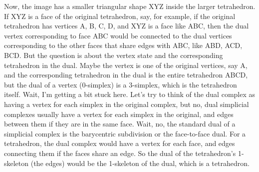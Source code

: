 Now, the image has a smaller triangular shape XYZ inside the larger tetrahedron. If XYZ is a face of the original tetrahedron, say, for example, if the original tetrahedron has vertices A, B, C, D, and XYZ is a face like ABC, then the dual vertex corresponding to face ABC would be connected to the dual vertices corresponding to the other faces that share edges with ABC, like ABD, ACD, BCD. But the question is about the vertex state and the corresponding tetrahedron in the dual. Maybe the vertex is one of the original vertices, say A, and the corresponding tetrahedron in the dual is the entire tetrahedron ABCD, but the dual of a vertex (0-simplex) is a 3-simplex, which is the tetrahedron itself. Wait, I'm getting a bit stuck here. Let's try to think of the dual complex as having a vertex for each simplex in the original complex, but no, dual simplicial complexes usually have a vertex for each simplex in the original, and edges between them if they are in the same face. Wait, no, the standard dual of a simplicial complex is the barycentric subdivision or the face-to-face dual. For a tetrahedron, the dual complex would have a vertex for each face, and edges connecting them if the faces share an edge. So the dual of the tetrahedron's 1-skeleton (the edges) would be the 1-skeleton of the dual, which is a tetrahedron. 


